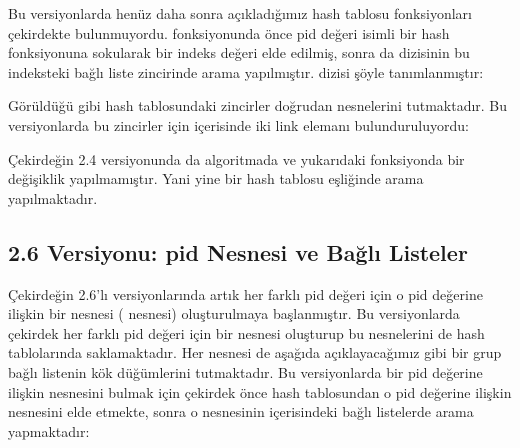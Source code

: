 \documentclass[a4paper,10pt,turkish]{sphinxmanual}
\begin{document}
\sphinxAtStartPar
Bu versiyonlarda henüz daha sonra açıkladığımız  hash tablosu fonksiyonları çekirdekte
bulunmuyordu.  fonksiyonunda önce pid değeri  isimli bir hash
fonksiyonuna sokularak bir indeks değeri elde edilmiş, sonra da  dizisinin bu indeksteki
bağlı liste zincirinde arama yapılmıştır.  dizisi şöyle tanımlanmıştır:

\begin{sphinxVerbatim}[commandchars=\\\{\}]
\PYG{p}{[}\PYG{p}{]}
\end{sphinxVerbatim}

\sphinxAtStartPar
Görüldüğü gibi hash tablosundaki zincirler doğrudan  nesnelerini tutmaktadır. Bu
versiyonlarda bu zincirler için  içerisinde iki link elemanı bulunduruluyordu:

\begin{sphinxVerbatim}[commandchars=\\\{\}]
\end{sphinxVerbatim}

\sphinxAtStartPar
Çekirdeğin 2.4 versiyonunda da algoritmada ve yukarıdaki fonksiyonda bir değişiklik yapılmamıştır.
Yani yine bir hash tablosu eşliğinde arama yapılmaktadır.


\subsection{2.6 Versiyonu: pid Nesnesi ve Bağlı Listeler}
\label{\detokenize{processcontrolblock:versiyonu-pid-nesnesi-ve-bagli-listeler}}
\sphinxAtStartPar
Çekirdeğin 2.6’lı versiyonlarında artık her farklı pid değeri için o pid değerine ilişkin bir
 nesnesi ( nesnesi) oluşturulmaya başlanmıştır. Bu versiyonlarda çekirdek her
farklı pid değeri için bir  nesnesi oluşturup bu  nesnelerini de hash tablolarında
saklamaktadır. Her  nesnesi de aşağıda açıklayacağımız gibi bir grup bağlı listenin kök
düğümlerini tutmaktadır. Bu versiyonlarda bir pid değerine ilişkin  nesnesini bulmak
için çekirdek önce hash tablosundan o pid değerine ilişkin  nesnesini elde etmekte, sonra o
 nesnesinin içerisindeki bağlı listelerde arama yapmaktadır:
\end{document}

